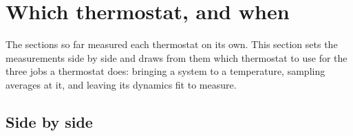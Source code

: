 \section{Which thermostat, and when}
\label{sec:th-compare}

The sections so far measured each thermostat on its own. This section
sets the measurements side by side and draws from them which thermostat
to use for the three jobs a thermostat does: bringing a system to a
temperature, sampling averages at it, and leaving its dynamics fit to
measure.

\subsection*{Side by side}

